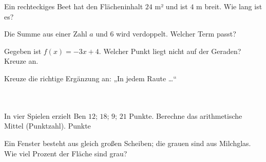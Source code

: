 \documentclass[11pt]{article}
\begin{document}
\begin{aufgabe}{Ein rechteckiges Beet hat den Flächeninhalt $24$ m² und ist $4$ m breit. Wie lang ist es? \leerfeld[m]}
\end{aufgabe}

\begin{aufgabe}{Die Summe aus einer Zahl $a$ und 6 wird verdoppelt. Welcher Term passt? \\    }
\end{aufgabe}

\begin{aufgabe}{Gegeben ist $f(x) = -3x + 4$. Welcher Punkt liegt nicht auf der Geraden? Kreuze an. \\   }
\end{aufgabe}

\begin{aufgabe}{Kreuze die richtige Ergänzung an: „In jedem Raute …“\\ \\ \\ }
\end{aufgabe}

\begin{aufgabe}{In vier Spielen erzielt Ben $12$; $18$; $9$; $21$ Punkte. Berechne das arithmetische Mittel (Punktzahl). \leerfeld Punkte}
\end{aufgabe}

\begin{aufgabe}{\begin{minipage}[t]{0.6\linewidth}Ein Fenster besteht aus gleich großen Scheiben; die grauen sind aus Milchglas. Wie viel Prozent der Fläche sind grau? \leerfeld[\%]\end{minipage}\hfill\begin{minipage}[t]{0.37\linewidth}\vspace{0pt}
\end{minipage}}
\end{aufgabe}
\end{document}
